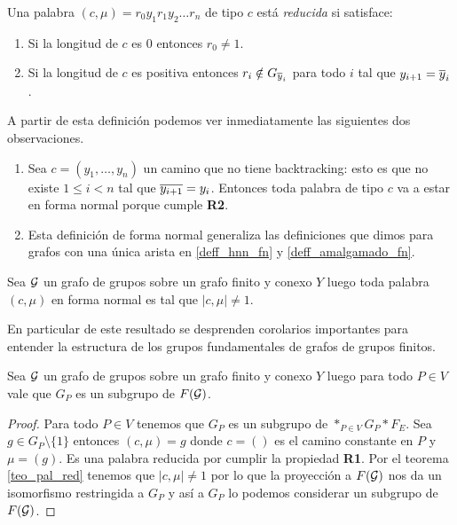 \documentclass[tesis.tex]{subfiles}
\begin{document}
\begin{deff}
	Una palabra $(c, \mu)=r_0 y_1 r_1 y_2 \dots r_n$ de tipo $c$ está \emph{reducida} si satisface:
	\begin{enumerate}[R1.]
		\item Si la longitud de $c$ es $0$ entonces $r_0 \neq 1$.
		\item Si la longitud de $c$ es positiva entonces $r_i \notin G_{\overline y_{i}}$ para todo $i$ tal que $y_{i+1} = \overline y_{i}$.
	\end{enumerate}
\end{deff}
A partir de esta definición podemos ver inmediatamente las siguientes dos observaciones.
\begin{enumerate}[1.]
	\item Sea $c=(y_1, \dots, y_n)$ un camino que no tiene backtracking: esto es que no existe $1 \le i  < n$ tal que $\overline {y_{i+1}} = y_{i}$.
	Entonces toda palabra de tipo $c$ va a estar en forma normal porque cumple \textbf{R2}.
	
	\item Esta definición de forma normal generaliza las definiciones que dimos para grafos con una única arista en \ref{deff_hnn_fn} y \ref{deff_amalgamado_fn}.
\end{enumerate}


\begin{teo}\label{teo_pal_red}
	Sea ${\cal G}$ un grafo de grupos sobre un grafo finito y conexo $Y$ luego toda palabra $(c, \mu)$ en forma normal es tal que $|c,\mu| \neq 1$.
\end{teo}

En particular de este resultado se desprenden corolarios importantes para entender la estructura de los grupos fundamentales de grafos de grupos finitos.

\begin{coro}\label{coro_pal_red_1}
	Sea ${\cal G}$ un grafo de grupos sobre un grafo finito y conexo $Y$ luego para todo $P \in V$ vale que $G_P$ es un subgrupo de $F({\cal G})$.
\end{coro}
\begin{proof}
	Para todo $P \in V$ tenemos que $G_P$ es un subgrupo de $\ast_{P \in V} G_P \ast F_E$.
	Sea  $g \in G_{P} \setminus \{ 1 \}$ entonces $(c, \mu) = g$ donde $c = ()$ es el camino constante en $P$ y $\mu = (g)$.
	Es una palabra reducida por cumplir la propiedad \textbf{R1}.
	Por el teorema \ref{teo_pal_red} tenemos que $|c,\mu| \neq 1$ por lo que  la proyección a $F({\cal G})$ nos da un isomorfismo restringida a $G_P$ y así a $G_P$ lo podemos considerar un subgrupo de $F({\cal G})$.
\end{proof}
\end{document}
